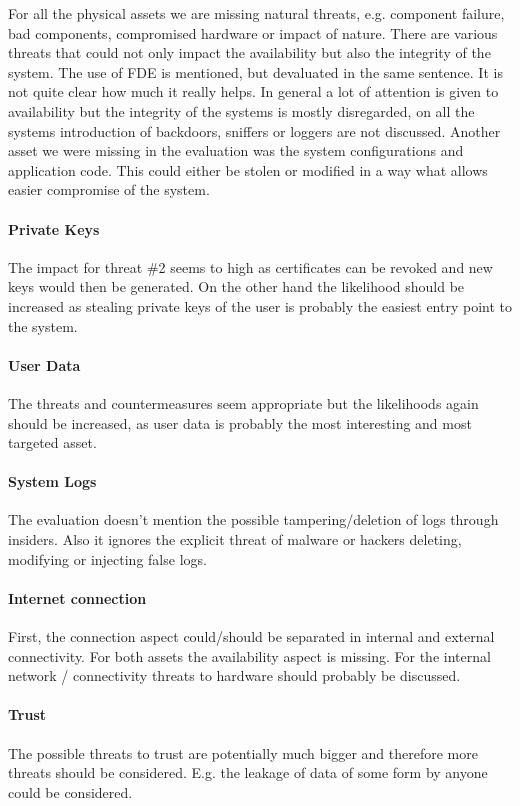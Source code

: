 \documentclass[english]{article}
\begin{document}
For all the physical assets we are missing natural threats, e.g. component failure, bad components, compromised hardware or impact of nature. There are various threats that could not only impact the availability but also the integrity of the system. The use of FDE is mentioned, but devaluated in the same sentence. It is not quite clear how much it really helps. In general a lot of attention is given to availability but the integrity of the systems is mostly disregarded, on all the systems introduction of backdoors, sniffers or loggers are not discussed. Another asset we were missing in the evaluation was the system configurations and application code. This could either be stolen or modified in a way what allows easier compromise of the system. 

\paragraph{Private Keys}
The impact for threat \#2 seems to high as certificates can be revoked and new keys would then be generated. On the other hand the likelihood should be increased as stealing private keys of the user is probably the easiest entry point to the system.  

\paragraph{User Data}
The threats and countermeasures seem appropriate but the likelihoods again should be increased, as user data is probably the most interesting and most targeted asset.

\paragraph{System Logs} 
The evaluation doesn't mention the possible tampering/deletion of logs through insiders. Also it ignores the explicit threat of malware or hackers deleting, modifying or injecting false logs. 

\paragraph{Internet connection} 
First, the connection aspect could/should be separated in internal and external connectivity. For both assets the availability aspect is missing. For the internal network / connectivity threats to hardware should probably be discussed.

\paragraph{Trust} 
The possible threats to trust are potentially much bigger and therefore more threats should be considered. E.g. the leakage of data of some form by anyone could be considered.
\end{document}
